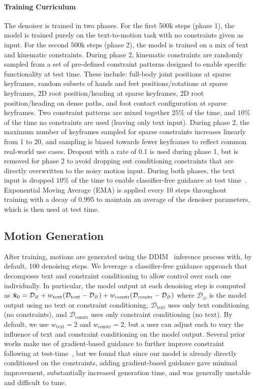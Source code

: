 \paragraph{Training Curriculum}
The denoiser is trained in two phases. For the first 500k steps (phase 1), the model is trained purely on the text-to-motion task with no constraints given as input. For the second 500k steps (phase 2), the model is trained on a mix of text and kinematic constraints.
During phase 2, kinematic constraints are randomly sampled from a set of pre-defined constraint patterns designed to enable specific functionality at test time. These include: full-body joint positions at sparse keyframes, random subsets of hands and feet positions/rotations at sparse keyframes, 2D root position/heading at sparse keyframes, 2D root position/heading on dense paths, and foot contact configuration at sparse keyframes. Two constraint patterns are mixed together $25\%$ of the time, and $10\%$ of the time no constraints are used (leaving only text input).
During phase 2, the maximum number of keyframes sampled for sparse constraints increases linearly from 1 to 20, and sampling is biased towards fewer keyframes to reflect common real-world use cases. 
Dropout with a rate of 0.1 is used during phase 1, but is removed for phase 2 to avoid dropping out conditioning constraints that are directly overwritten to the noisy motion input.
During both phases, the text input is dropped $10\%$ of the time to enable classifier-free guidance at test time~\cite{ho2022classifier}. 
Exponential Moving Average (EMA) is applied every 10 steps throughout training with a decay of 0.995 to maintain an average of the denoiser parameters, which is then used at test time.

\subsection{Motion Generation}
\label{sec:method:inference}
After training, motions are generated using the DDIM~\cite{song2020denoising} inference process with, by default, 100 denoising steps.
We leverage a classifier-free guidance approach that decomposes text and constraint conditioning to allow control over each one individually. 
In particular, the model output at each denoising step is computed as $\hat{\mathbf{x}}_0 = \mathcal{D}_\varnothing + w_\text{text}(\mathcal{D}_\text{text}  - \mathcal{D}_\varnothing) + w_\text{constr}(\mathcal{D}_\text{constr}  - \mathcal{D}_\varnothing)$ where $\mathcal{D}_\varnothing$ is the model output using no text or constraint conditioning, $\mathcal{D}_\text{text}$ uses only text conditioning (no constraints), and $\mathcal{D}_\text{constr}$ uses only constraint conditioning (no text). 
By default, we use $w_\text{text} = 2$ and $w_\text{constr} = 2$, but a user can adjust each to vary the influence of text and constraint conditioning on the model output. 
Several prior works make use of gradient-based guidance to further improve constraint following at test-time~\cite{rempeluo2023tracepace,karunratanakul2023gmd}, but we found that since our model is already directly conditioned on the constraints, adding gradient-based guidance gave minimal improvement, substantially increased generation time, and was generally unstable and difficult to tune.

